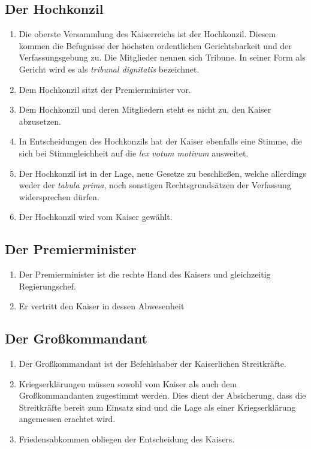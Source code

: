 \documentclass{article}
\begin{document}
\subsection{Der Hochkonzil}
\begin{enumerate}[(1)]
    \item Die oberste Versammlung des Kaiserreichs ist der Hochkonzil. Diesem kommen die Befugnisse der höchsten ordentlichen Gerichtsbarkeit und der Verfassungsgebung zu. Die Mitglieder nennen sich Tribune. In seiner Form als Gericht wird es als \textit{tribunal dignitatis} bezeichnet.
    \item Dem Hochkonzil sitzt der Premierminister vor.
    \item Dem Hochkonzil und deren Mitgliedern steht es nicht zu, den Kaiser abzusetzen.
    \item In Entscheidungen des Hochkonzils hat der Kaiser ebenfalls eine Stimme, die sich bei Stimmgleichheit auf die \textit{lex votum motivum} ausweitet.
    \item Der Hochkonzil ist in der Lage, neue Gesetze zu beschließen, welche allerdings weder der \textit{tabula prima}, noch sonstigen Rechtsgrundsätzen der Verfassung widersprechen dürfen.
    \item Der Hochkonzil wird vom Kaiser gewählt.
\end{enumerate}

\subsection{Der Premierminister}
\begin{enumerate}[(1)]
    \item Der Premierminister ist die rechte Hand des Kaisers und gleichzeitig Regierungschef.
    \item Er vertritt den Kaiser in dessen Abwesenheit
\end{enumerate}

\subsection{Der Großkommandant}
\begin{enumerate}[(1)]
    \item Der Großkommandant ist der Befehlshaber der Kaiserlichen Streitkräfte.
    \item Kriegserklärungen müssen sowohl vom Kaiser als auch dem Großkommandanten zugestimmt werden. Dies dient der Absicherung, dass die Streitkräfte bereit zum Einsatz sind und die Lage als einer Kriegserklärung angemessen erachtet wird.
    \item Friedensabkommen obliegen der Entscheidung des Kaisers.
\end{enumerate}
\end{document}
